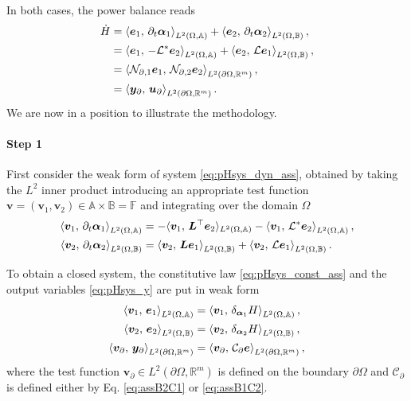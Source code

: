 In both cases, the power balance reads
\begin{equation}\label{eq:powbal_2}
\begin{aligned}
\dot{H} &= \inner[L^2(\Omega, \mathbb{A})]{\bm{e}_1}{\partial_{t} \bm{\alpha}_1} + \inner[L^2(\Omega, \mathbb{B})]{\bm{e}_2}{\partial_{t} \bm{\alpha}_2}, \\
&=\inner[L^2(\Omega, \mathbb{A})]{\bm{e}_1}{-\mathcal{L}^* \bm{e}_2} + \inner[L^2(\Omega, \mathbb{B})]{\bm{e}_2}{\mathcal{L} \bm{e}_1}, \\
&= \inner[L^2(\partial \Omega, \mathbb{R}^m)]{\mathcal{N}_{\partial, 1} \bm{e}_1}{\mathcal{N}_{\partial, 2} \bm{e}_2}, \\
&= \inner[L^2(\partial \Omega, \mathbb{R}^m)]{\bm{y}_\partial}{\bm{u}_\partial}.
\end{aligned}
\end{equation}
We are now in a position to illustrate the methodology. 
\paragraph{Step 1} First consider the weak form of system \eqref{eq:pHsys_dyn_ass}, obtained by taking the $L^2$ inner product introducing an appropriate test function $\bm{v} = (\bm{v}_1, \bm{v}_2) \in \mathbb{A} \times \mathbb{B} = \mathbb{F}$ and integrating over the domain $\Omega$
\begin{equation}\label{eq:weak_dyn}
\begin{aligned}
\inner[L^2(\Omega, \mathbb{A})]{\bm{v}_1}{\partial_t \bm{\alpha}_1} &= -  \langle{\bm{v}_1},\,{\bm{L}^\top \bm{e}_2}\rangle_{L^2(\Omega, \mathbb{A})} -  \inner[L^2(\Omega, \mathbb{A})]{\bm{v}_1}{\mathcal{L}^*\bm{e}_2}, \\
\inner[L^2(\Omega, \mathbb{B})]{\bm{v}_2}{\partial_t \bm{\alpha}_2} &= \inner[L^2(\Omega, \mathbb{B})]{\bm{v}_2}{\bm{L}\bm{e}_1}+ \inner[L^2(\Omega, \mathbb{B})]{\bm{v}_2}{\mathcal{L}\bm{e}_1}.
\end{aligned}
\end{equation}



To obtain a closed system, the constitutive law \eqref{eq:pHsys_const_ass} and the output variables \eqref{eq:pHsys_y} are put in weak form
\begin{equation}
\begin{aligned}
\inner[L^2(\Omega, \mathbb{A})]{\bm{v}_1}{\bm{e}_1}&= \inner[L^2(\Omega, \mathbb{A})]{\bm{v}_1}{\delta_{\bm{\alpha}_1} H}, \\
\inner[L^2(\Omega, \mathbb{B})]{\bm{v}_2}{\bm{e}_2}&= \inner[L^2(\Omega, \mathbb{B})]{\bm{v}_2}{\delta_{\bm{\alpha}_2} H}, \\
\inner[L^2(\partial \Omega, \mathbb{R}^m)]{\bm{v}_\partial}{\bm{y}_\partial} &= \inner[L^2(\partial \Omega, \mathbb{R}^m)]{\bm{v}_\partial}{\mathcal{C}_\partial \bm{e}},
\end{aligned}
\end{equation}
where the test function $\bm{v}_\partial \in L^2(\partial \Omega, \mathbb{R}^m)$ is defined on the boundary $\partial\Omega$ and $\mathcal{C}_\partial$ is defined either by Eq. \eqref{eq:assB2C1} or  \eqref{eq:assB1C2}.


